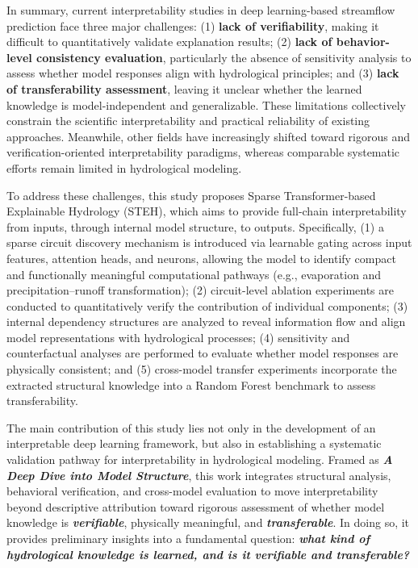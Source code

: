 In summary, current interpretability studies in deep learning-based streamflow prediction face three major challenges: (1) \textbf{lack of verifiability}, making it difficult to quantitatively validate explanation results; (2) \textbf{lack of behavior-level consistency evaluation}, particularly the absence of sensitivity analysis to assess whether model responses align with hydrological principles; and (3) \textbf{lack of transferability assessment}, leaving it unclear whether the learned knowledge is model-independent and generalizable. These limitations collectively constrain the scientific interpretability and practical reliability of existing approaches. Meanwhile, other fields have increasingly shifted toward rigorous and verification-oriented interpretability paradigms, whereas comparable systematic efforts remain limited in hydrological modeling.

To address these challenges, this study proposes Sparse Transformer-based Explainable Hydrology (STEH), which aims to provide full-chain interpretability from inputs, through internal model structure, to outputs. Specifically, (1) a sparse circuit discovery mechanism is introduced via learnable gating across input features, attention heads, and neurons, allowing the model to identify compact and functionally meaningful computational pathways (e.g., evaporation and precipitation--runoff transformation); (2) circuit-level ablation experiments are conducted to quantitatively verify the contribution of individual components; (3) internal dependency structures are analyzed to reveal information flow and align model representations with hydrological processes; (4) sensitivity and counterfactual analyses are performed to evaluate whether model responses are physically consistent; and (5) cross-model transfer experiments incorporate the extracted structural knowledge into a Random Forest benchmark to assess transferability.

The main contribution of this study lies not only in the development of an interpretable deep learning framework, but also in establishing a systematic validation pathway for interpretability in hydrological modeling. Framed as \textbf{\textit{A Deep Dive into Model Structure}}, this work integrates structural analysis, behavioral verification, and cross-model evaluation to move interpretability beyond descriptive attribution toward rigorous assessment of whether model knowledge is \textbf{\textit{verifiable}}, physically meaningful, and \textbf{\textit{transferable}}. In doing so, it provides preliminary insights into a fundamental question: \textbf{\emph{what kind of hydrological knowledge is learned, and is it verifiable and transferable?}}